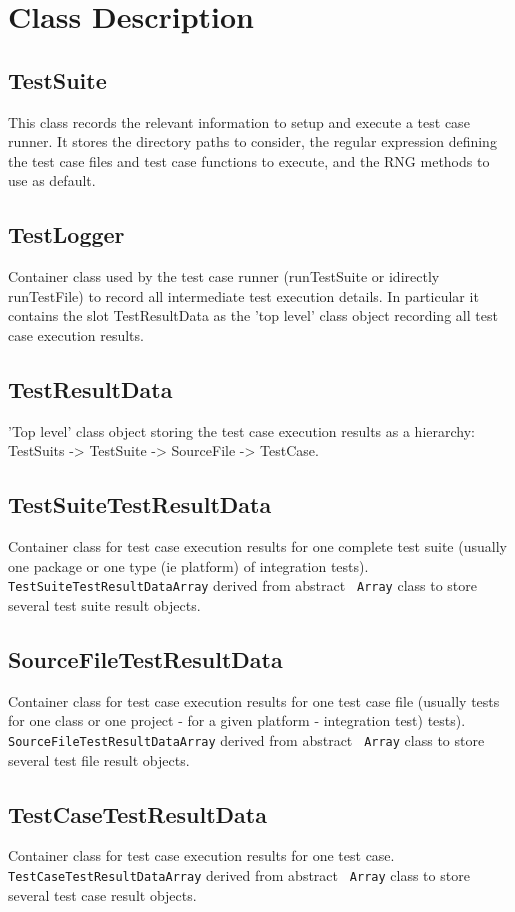 \documentclass[a4paper,10pt]{article}
\begin{document}
\section{Class Description}

\subsection{TestSuite}
This class records the relevant information to setup and execute a
test case runner. It stores the directory paths to consider, the
regular expression defining the test case files and test case
functions to execute, and the RNG methods to use as default.

\subsection{TestLogger}
Container class used by the test case runner (runTestSuite or
idirectly runTestFile) to record all intermediate test execution
details. In particular it contains the slot TestResultData as the 'top
level' class object recording all test case execution results.

\subsection{TestResultData}
'Top level' class object storing the test case execution results as a
hierarchy: TestSuits -> TestSuite -> SourceFile -> TestCase.

\subsection{TestSuiteTestResultData}
Container class for test case execution results for one complete test
suite (usually one package or one type (ie platform) of integration
tests). {\tt TestSuiteTestResultDataArray} derived from abstract {\tt
Array} class to store several test suite result objects.


\subsection{SourceFileTestResultData}
Container class for test case execution results for one test
case file (usually tests for one class or one project - for a given platform -
integration test)
tests). {\tt SourceFileTestResultDataArray} derived from abstract {\tt
Array} class to store several test file result objects. 


\subsection{TestCaseTestResultData}
Container class for test case execution results for one test
case. {\tt TestCaseTestResultDataArray} derived from abstract {\tt
Array} class to store several test case result objects. 
\end{document}
